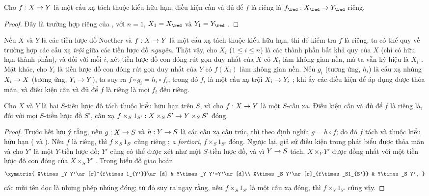 \documentclass[oneside,10pt]{amsart}
\makeatletter
\renewcommand{\leq}{\leqslant}
\newcommand{\ega@arrow}[2]{\mathchoice{#1}{#2}{#2}{#2}}
\renewcommand{\to}{\ega@arrow{\longrightarrow}{\rightarrow}}
\let\EGAOriginalLabel\label
\renewcommand{\label}[1]{\phantomsection\EGAOriginalLabel{#1}}
\makeatother
\begin{document}
\begin{corollary}[5.4.6]
\label{II.5.4.6}
Cho $f:X\to Y$ là một cấu xạ tách thuộc kiểu hữu hạn; điều kiện cần và đủ để $f$ là riêng là $f_\red:X_\red\to Y_\red$ riêng.
\end{corollary}

\begin{proof}
Đây là trường hợp riêng của , với $n=1$, $X_1=X_\red$ và $Y_1=Y_\red$ .
\end{proof}

\begin{env}[5.4.7]
\label{II.5.4.7}
Nếu $X$ và $Y$ là các tiền lược đồ Noether và $f:X\to Y$ là một cấu xạ tách thuộc kiểu hữu hạn, thì để kiểm tra $f$ là riêng, ta có thể quy về trường hợp các cấu xạ \emph{trội} giữa các tiền lược đồ \emph{nguyên}.
Thật vậy, cho $X_i$ ($1\leq i\leq n$) là các thành phần bất khả quy của $X$ (chỉ có hữu hạn thành phần), và đối với mỗi $i$, xét tiền lược đồ con đóng rút gọn duy nhất của $X$ có $X_i$ làm không gian nền, mà ta vẫn ký hiệu là $X_i$ .
Mặt khác, cho $Y_i$ là tiền lược đồ con đóng rút gọn duy nhất của $Y$ có $\overline{f(X_i)}$ làm không gian nền.
Nếu $g_i$ (tương ứng, $h_i$) là cấu xạ nhúng $X_i\to X$ (tương ứng, $Y_i\to Y$), ta suy ra $f\circ g_i=h_i\circ f_i$, trong đó $f_i$ là một cấu xạ trội $X_i\to Y_i$ ;
khi ấy các điều kiện để áp dụng  được thỏa mãn, và điều kiện cần và đủ để $f$ là riêng là mọi $f_i$ đều riêng.
\end{env}

\begin{corollary}[5.4.8]
\label{II.5.4.8}
Cho $X$ và $Y$ là hai $S$-tiền lược đồ tách thuộc kiểu hữu hạn trên $S$, và cho $f:X\to Y$ là một $S$-cấu xạ.
Điều kiện cần và đủ để $f$ là riêng là, đối với mọi $S$-tiền lược đồ $S'$, cấu xạ $f\times_S 1_{S'}:X\times_S S'\to Y\times_S S'$ đóng.
\end{corollary}

\begin{proof}
Trước hết lưu ý rằng, nếu $g:X\to S$ và $h:Y\to S$ là các cấu xạ cấu trúc, thì theo định nghĩa $g=h\circ f$; do đó $f$ tách và thuộc kiểu hữu hạn ( và ).
Nếu $f$ là riêng, thì $f\times_S 1_{S'}$ cũng riêng ; \emph{a fortiori}, $f\times_S 1_{S'}$ đóng.
Ngược lại, giả sử điều kiện trong phát biểu được thỏa mãn và cho $Y'$ là một $Y$-tiền lược đồ;
$Y'$ cũng có thể được xét như một $S$-tiền lược đồ, và vì $Y\to S$ tách, $X\times_Y Y'$ được đồng nhất với một tiền lược đồ con đóng của $X\times_S Y'$ .
Trong biểu đồ giao hoán
\[
  \xymatrix{
    X\times_Y Y'\ar[r]^{f\times1_{Y'}}\ar[d] &
    Y\times_Y Y'=Y'\ar[d]\\
    X\times_S Y'\ar[r]_{f\times_S1_{S'}} &
    Y\times_S Y',
  }
\]
các mũi tên dọc là những phép nhúng đóng; từ đó suy ra ngay rằng, nếu $f\times_S1_{S'}$ là một cấu xạ đóng, thì $f\times_Y1_{Y'}$ cũng vậy.
\end{proof}
\end{document}
